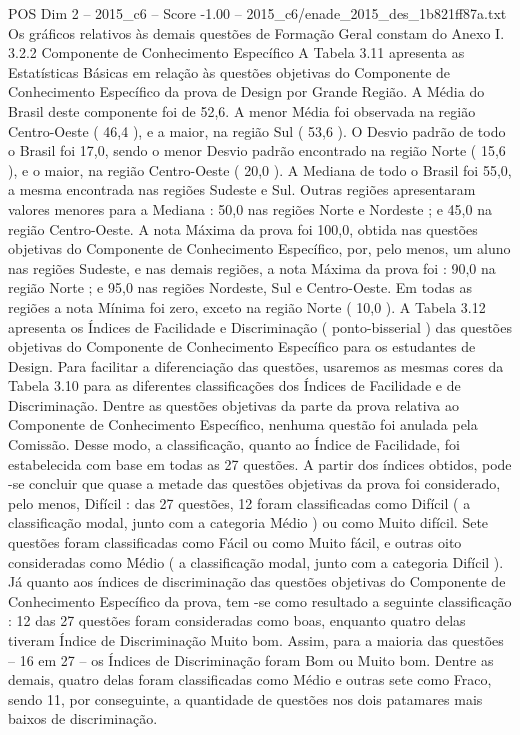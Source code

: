 \begin{textsample}{POS Dim 2 – 2015\_c6 – Score -1.00 – 2015\_c6/enade\_2015\_des\_1b821ff87a.txt}
Os gráficos relativos às demais questões de Formação Geral constam do Anexo I. 3.2.2 Componente de Conhecimento Específico A Tabela 3.11 apresenta as Estatísticas Básicas em relação às questões objetivas do Componente de Conhecimento Específico da prova de Design por Grande Região.
A Média do Brasil deste componente foi de 52,6.
A menor Média foi observada na região Centro-Oeste ( 46,4 ), e a maior, na região Sul ( 53,6 ).
O Desvio padrão de todo o Brasil foi 17,0, sendo o menor Desvio padrão encontrado na região Norte ( 15,6 ), e o maior, na região Centro-Oeste ( 20,0 ).
A Mediana de todo o Brasil foi 55,0, a mesma encontrada nas regiões Sudeste e Sul.
Outras regiões apresentaram valores menores para a Mediana : 50,0 nas regiões Norte e Nordeste ; e 45,0 na região Centro-Oeste.
A nota Máxima da prova foi 100,0, obtida nas questões objetivas do Componente de Conhecimento Específico, por, pelo menos, um aluno nas regiões Sudeste, e nas demais regiões, a nota Máxima da prova foi : 90,0 na região Norte ; e 95,0 nas regiões Nordeste, Sul e Centro-Oeste.
Em todas as regiões a nota Mínima foi zero, exceto na região Norte ( 10,0 ).
A Tabela 3.12 apresenta os Índices de Facilidade e Discriminação ( ponto-bisserial ) das questões objetivas do Componente de Conhecimento Específico para os estudantes de Design.
Para facilitar a diferenciação das questões, usaremos as mesmas cores da Tabela 3.10 para as diferentes classificações dos Índices de Facilidade e de Discriminação.
Dentre as questões objetivas da parte da prova relativa ao Componente de Conhecimento Específico, nenhuma questão foi anulada pela Comissão.
Desse modo, a classificação, quanto ao Índice de Facilidade, foi estabelecida com base em todas as 27 questões.
A partir dos índices obtidos, pode -se concluir que quase a metade das questões objetivas da prova foi considerado, pelo menos, Difícil : das 27 questões, 12 foram classificadas como Difícil ( a classificação modal, junto com a categoria Médio ) ou como Muito difícil.
Sete questões foram classificadas como Fácil ou como Muito fácil, e outras oito consideradas como Médio ( a classificação modal, junto com a categoria Difícil ).
Já quanto aos índices de discriminação das questões objetivas do Componente de Conhecimento Específico da prova, tem -se como resultado a seguinte classificação : 12 das 27 questões foram consideradas como boas, enquanto quatro delas tiveram Índice de Discriminação Muito bom.
Assim, para a maioria das questões – 16 em 27 – os Índices de Discriminação foram Bom ou Muito bom.
Dentre as demais, quatro delas foram classificadas como Médio e outras sete como Fraco, sendo 11, por conseguinte, a quantidade de questões nos dois patamares mais baixos de discriminação.

\end{textsample}
